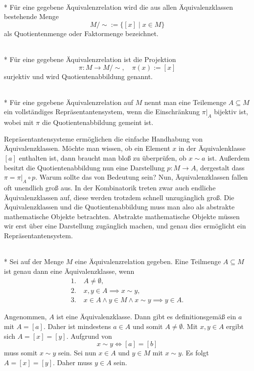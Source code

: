 \begin{Definition}[Quotientenmenge]
\mbox{}\\*
Für eine gegebene Äquivalenzrelation wird die aus allen
Äquivalenzklassen bestehende Menge
\[M/{\sim} := \{[x]\mid x\in M\}\]
als Quotientenmenge oder Faktormenge bezeichnet.
\end{Definition}

\begin{Definition}[Quotientenabbildung]%
\mbox{}\\*
Für eine gegebene Äquivalenzrelation ist die Projektion
\[\pi\colon M\to M/{\sim},\quad \pi(x):=[x]\]
surjektiv und wird Quotientenabbildung genannt.
\end{Definition}

\newpage
\begin{Definition}[Repräsentantensystem]%
\mbox{}\\*
Für eine gegebene Äquivalenzrelation auf $M$ nennt man eine
Teilemenge $A\subseteq M$ ein vollständiges Repräsentantensystem,
wenn die Einschränkung $\pi|_A$ bijektiv ist, wobei mit $\pi$
die Quotientenabbildung gemeint ist.
\end{Definition}
Repräsentantensysteme ermöglichen die einfache Handhabung von
Äquivalenzklassen. Möchte man wissen, ob ein Element $x$ in der
Äquivalenklasse $[a]$ enthalten ist, dann braucht man bloß
zu überprüfen, ob $x\sim a$ ist. Außerdem besitzt die
Quotientenabbildung nun eine Darstellung $p\colon M\to A$,
dergestalt dass $\pi = \pi|_{A}\circ p$. Warum sollte das von
Bedeutung sein? Nun, Äquivalenzklassen fallen oft unendlich groß
aus. In der Kombinatorik treten zwar auch endliche Äquivalenzklassen auf,
diese werden trotzdem schnell unzugänglich groß. Die Äquivalenzklassen
und die Quotientenabbildung muss man also als abstrakte mathematische
Objekte betrachten. Abstrakte mathematische Objekte müssen wir erst
über eine Darstellung zugänglich machen, und genau dies ermöglicht
ein Repräsentantensystem.


\begin{Satz}\mbox{}\\*
Sei auf der Menge $M$ eine Äquivalenzrelation gegeben. Eine
Teilmenge $A\subseteq M$ ist genau dann eine Äquivalenzklasse,
wenn%
\begin{align*}
1.\;& A\ne\emptyset,\\
2.\;& x,y\in A\implies x\sim y,\\
3.\;& x\in A\land y\in M\land x\sim y\implies y\in A.
\end{align*}
\end{Satz}
 Angenommen, $A$ ist eine Äquivalenzklasse.
Dann gibt es definitionsgemäß ein $a$ mit $A=[a]$. Daher ist
mindestens $a\in A$ und somit $A\ne\emptyset$. Mit $x,y\in A$ ergibt
sich $A=[x]=[y]$. Aufgrund von%
\[x\sim y \iff [a]=[b]\]
muss somit $x\sim y$ sein. Sei nun $x\in A$ und $y\in M$ mit
$x\sim y$. Es folgt $A=[x]=[y]$. Daher muss $y\in A$ sein.

